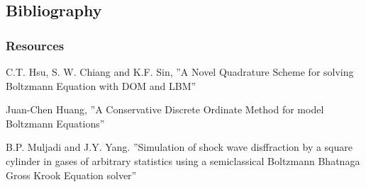 \documentclass[11pt,fleqn]{beamer}
\begin{document}
\subsection{Bibliography}
\begin{frame}
	\frametitle{Resources}
	 \begin{thebibliography}{10}

  	\beamertemplatearticlebibitems

    	C.T. Hsu, S. W. Chiang and K.F. Sin, ''A Novel Quadrature Scheme for solving Boltzmann Equation with DOM and LBM''

    	Juan-Chen Huang, ''A Conservative Discrete Ordinate Method for model Boltzmann Equations''

	B.P. Muljadi and J.Y. Yang. ''Simulation of shock wave disffraction by a square cylinder in gases of arbitrary statistics using a semiclassical Boltzmann Bhatnaga Gross Krook Equation solver''
  \end{thebibliography}

\end{frame}
\end{document}
